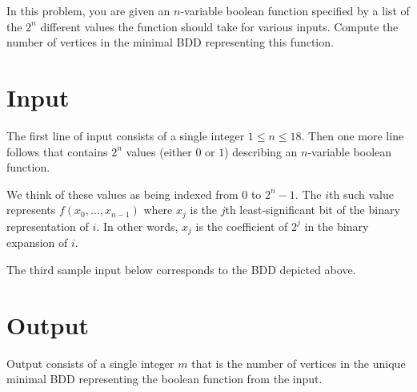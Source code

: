 In this problem, you are given an $n$-variable boolean function specified
by a list of the $2^n$ different values the function should take for
various inputs. Compute the number of vertices in the minimal BDD
representing this function.

\section*{Input}
The first line of input consists of a single integer $1 \leq n \leq 18$.
Then one more line follows that contains $2^n$ values (either $0$ or $1$)
describing an $n$-variable boolean function.

We think of these values as being indexed from $0$ to $2^n-1$. The $i$th
such value represents
$f(x_0, \ldots, x_{n-1})$ where $x_j$ is the
$j$th least-significant bit of the binary representation of $i$. In other
words, $x_j$ is the coefficient of $2^j$ in the binary expansion
of $i$.

The third sample input below corresponds to the BDD depicted above.

\section*{Output}
Output consists of a single integer $m$ that is the number of vertices
in the unique minimal BDD representing the boolean function from the input.
